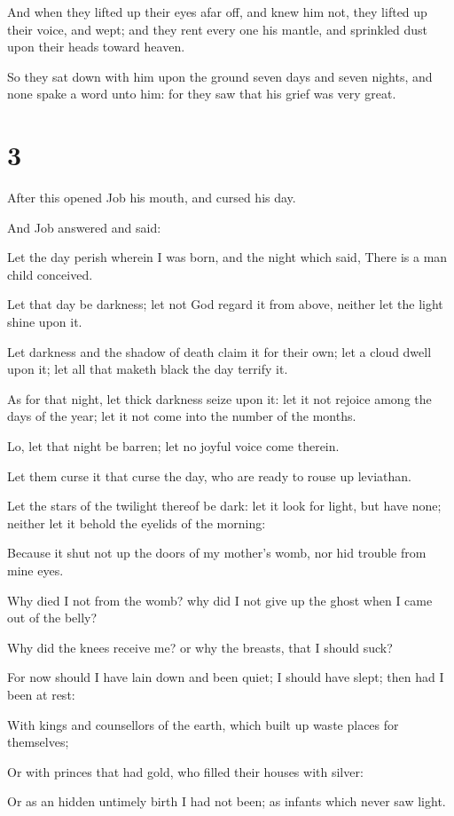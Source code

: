 \documentclass[12pt,oneside]{book}
\begin{document}
And when they lifted up their eyes afar off, and knew him not, they lifted up their voice, and wept; and they rent every one his mantle, and sprinkled dust upon their heads toward heaven.

So they sat down with him upon the ground seven days and seven nights, and none spake a word unto him: for they saw that his grief was very great.

\chapter{3}
After this opened Job his mouth, and cursed his day.

And Job answered and said:

Let the day perish wherein I was born, and the night which said, There is a man child conceived.

Let that day be darkness; let not God regard it from above, neither let the light shine upon it.

Let darkness and the shadow of death claim it for their own; let a cloud dwell upon it; let all that maketh black the day terrify it.

As for that night, let thick darkness seize upon it: let it not rejoice among the days of the year; let it not come into the number of the months.

Lo, let that night be barren; let no joyful voice come therein.

Let them curse it that curse the day, who are ready to rouse up leviathan.

Let the stars of the twilight thereof be dark: let it look for light, but have none; neither let it behold the eyelids of the morning:

Because it shut not up the doors of my mother's womb, nor hid trouble from mine eyes.

Why died I not from the womb? why did I not give up the ghost when I came out of the belly?

Why did the knees receive me? or why the breasts, that I should suck?

For now should I have lain down and been quiet; I should have slept; then had I been at rest:

With kings and counsellors of the earth, which built up waste places for themselves;

Or with princes that had gold, who filled their houses with silver:

Or as an hidden untimely birth I had not been; as infants which never saw light.
\end{document}

